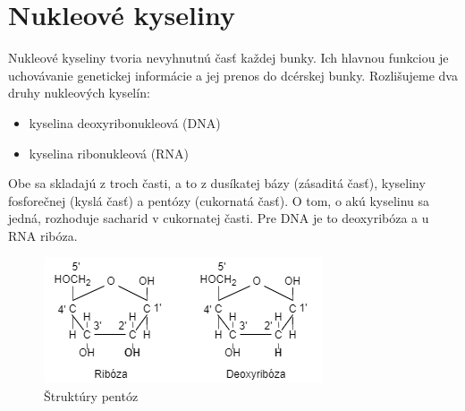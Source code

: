 \section{Nukleové kyseliny}
Nukleové kyseliny tvoria nevyhnutnú časť každej bunky. Ich hlavnou funkciou je uchovávanie genetickej informácie a jej prenos do dcérskej bunky. Rozlišujeme dva druhy nukleových kyselín:
\begin{itemize}
\item kyselina deoxyribonukleová (DNA)
\item kyselina ribonukleová (RNA)
\end{itemize} 
Obe sa skladajú z troch časti, a to z dusíkatej bázy (zásaditá časť), kyseliny fosforečnej (kyslá časť) a pentózy (cukornatá časť). O tom, o akú kyselinu sa jedná,  rozhoduje sacharid v cukornatej časti. Pre DNA je to deoxyribóza a u RNA ribóza. 
\begin{figure}[!ht]
\centering
\includegraphics[scale =0.8]{obrazky-figures/riboza2.png}
\caption{Štruktúry pentóz}
\end{figure} 

\newpage

